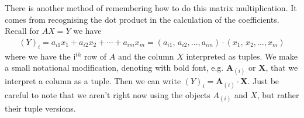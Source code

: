 \noindent There is another method of remembering how to do this matrix multiplication. It comes from recognising the dot product in the calculation of the coefficients. Recall for $AX=Y$ we have
\begin{align*}
(Y)_i = a_{i1}x_1 + a_{i2}x_2 + \cdots + a_{im}x_m = \left(a_{i1},\,a_{i2}, \dots, a_{im}  \right) \cdot \left(x_{1},\,x_{2}, \dots, x_{m}  \right)
\end{align*}
where we have the i$^{th}$ row of $A$ and the column $X$ interpreted as tuples. We make a small notational modification, denoting with bold font, e.g. $\mathbf{A}_{(i)}$ or $\mathbf{X}$, that we interpret a column as a tuple. Then we can write $(Y)_i = \mathbf{A}_{(i)} \cdot \mathbf{X}$. Just be careful to note that we aren't right now using the objects $A_{(i)}$ and $X$, but rather their tuple versions.




